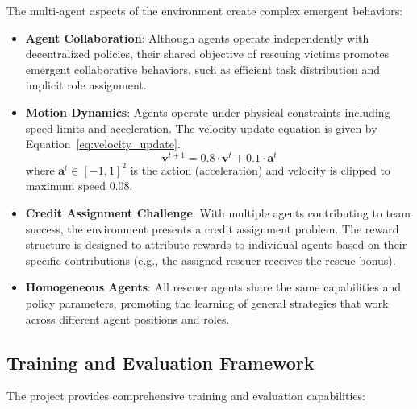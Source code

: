 \documentclass[11pt,a4paper]{article}
\begin{document}
The multi-agent aspects of the environment create complex emergent behaviors:

\begin{itemize}
    \item \textbf{Agent Collaboration}: Although agents operate independently with decentralized policies, their shared objective of rescuing victims promotes emergent collaborative behaviors, such as efficient task distribution and implicit role assignment.

    \item \textbf{Motion Dynamics}: Agents operate under physical constraints including speed limits and acceleration.
    The velocity update equation is given by Equation~\ref{eq:velocity_update}.
    \begin{equation}
    \label{eq:velocity_update}
    \mathbf{v}^{t+1} = 0.8 \cdot \mathbf{v}^t + 0.1 \cdot \mathbf{a}^t
    \end{equation}
    where $\mathbf{a}^t \in [-1, 1]^2$ is the action (acceleration) and velocity is clipped to maximum speed 0.08.

    \item \textbf{Credit Assignment Challenge}: With multiple agents contributing to team success, the environment presents a credit assignment problem.
    The reward structure is designed to attribute rewards to individual agents based on their specific contributions (e.g., the assigned rescuer receives the rescue bonus).

    \item \textbf{Homogeneous Agents}: All rescuer agents share the same capabilities and policy parameters, promoting the learning of general strategies that work across different agent positions and roles.
\end{itemize}

\subsection{Training and Evaluation Framework}
\label{subsec:training_eval}

The project provides comprehensive training and evaluation capabilities:
\end{document}
